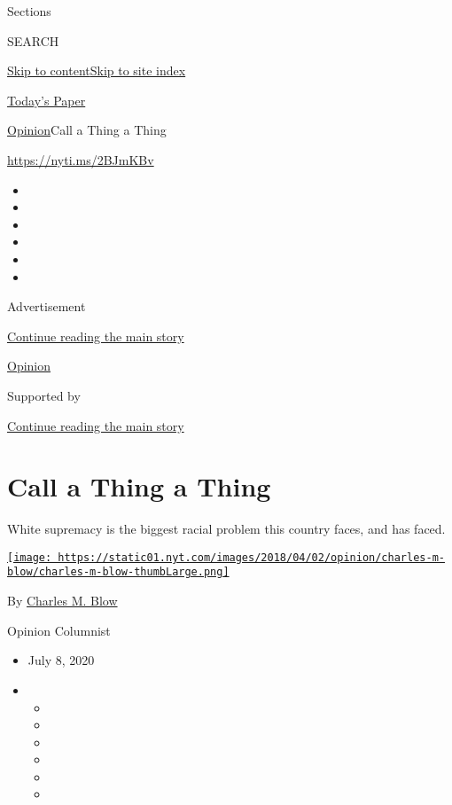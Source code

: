 Sections

SEARCH

\protect\hyperlink{site-content}{Skip to
content}\protect\hyperlink{site-index}{Skip to site index}

\href{https://myaccount.nytimes.com/auth/login?response_type=cookie\&client_id=vi}{}

\href{https://www.nytimes.com/section/todayspaper}{Today's Paper}

\href{/section/opinion}{Opinion}\textbar{}Call a Thing a Thing

\href{https://nyti.ms/2BJmKBv}{https://nyti.ms/2BJmKBv}

\begin{itemize}
\item
\item
\item
\item
\item
\item
\end{itemize}

Advertisement

\protect\hyperlink{after-top}{Continue reading the main story}

\href{/section/opinion}{Opinion}

Supported by

\protect\hyperlink{after-sponsor}{Continue reading the main story}

\hypertarget{call-a-thing-a-thing}{%
\section{Call a Thing a Thing}\label{call-a-thing-a-thing}}

White supremacy is the biggest racial problem this country faces, and
has faced.

\href{https://www.nytimes.com/by/charles-m-blow}{\texttt{[image: https://static01.nyt.com/images/2018/04/02/opinion/charles-m-blow/charles-m-blow-thumbLarge.png]}}

By \href{https://www.nytimes.com/by/charles-m-blow}{Charles M. Blow}

Opinion Columnist

\begin{itemize}
\item
  July 8, 2020
\item
  \begin{itemize}
  \item
  \item
  \item
  \item
  \item
  \item
  \end{itemize}
\end{itemize}

